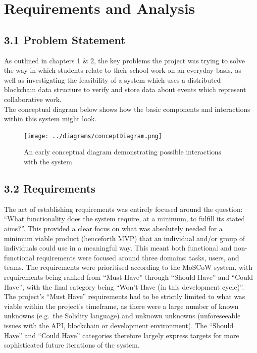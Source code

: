 \documentclass[12pt]{report}
\begin{document}
\chapter{Requirements and Analysis}

\section{3.1 Problem Statement}\label{problem-statement}

As outlined in chapters 1 \& 2, the key problems the project was trying
to solve the way in which students relate to their school work on an
everyday basis, as well as investigating the feasibility of a system
which uses a distributed blockchain data structure to verify and store
data about events which represent collaborative work.\\
The conceptual diagram below shows how the basic components and
interactions within this system might look.

\begin{figure}[htbp]
\centering
\texttt{[image: ../diagrams/conceptDiagram.png]}
\caption{An early conceptual diagram demonstrating possible interactions
with the system}
\end{figure}

\section{3.2 Requirements}\label{requirements}

The act of establishing requirements was entirely focused around the
question: ``What functionality does the system require, at a minimum, to
fulfill its stated aims?''. This provided a clear focus on what was
absolutely needed for a minimum viable product (henceforth
MVP)\cite{ries2009minimum} that an individual and/or group of individuals could use in
a meaningful way. This meant both functional and non-functional
requirements were focused around three domains: tasks, users, and teams.
The requirements were prioritised according to the MoSCoW
system\cite{1moscow},
with requirements being ranked from ``Must Have'' through ``Should
Have'' and ``Could Have'', with the final category being ``Won't Have
(in this development cycle)''. The project's ``Must Have'' requirements
had to be strictly limited to what was viable within the project's
timeframe, as there were a large number of known unknowns (e.g.~the
Solidity language) and unknown unknowns (unforeseeable issues with the
API, blockchain or development environment). The ``Should Have'' and
``Could Have'' categories therefore largely express targets for more
sophisticated future iterations of the system.
\end{document}
